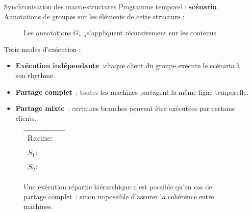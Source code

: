 \begin{block}{Synchronisation des macro-structures}
	Programme temporel : \textbf{scénario}. 
	Annotations de groupes sur les éléments de cette structure : 
    
    \begin{figure}
        \begin{tikzpicture}[scale=4]
        
        \end{tikzpicture}
        \caption{Les annotations $G_{1..5}$s'appliquent récursivement sur les contenus}
    \end{figure}
	Trois modes d'exécution : 
	\begin{itemize}
		\item \textbf{Exécution indépendante}~:chaque client du groupe exécute le scénario à son rhythme.
		\item \textbf{Partage complet}~: toutes les machines partagent la même ligne temporelle.
		\item \textbf{Partage mixte}~: certaines branches peuvent être exécutées par certains clients.
	\end{itemize}

    
    \begin{figure} \hspace*{-11cm}
        \begin{tabular}{L{3.5em}R{0.3\textwidth}}
            Racine: & \begin{tikzpicture}[scale=3.5]
            
            \end{tikzpicture} \\
            $S_1$: & \begin{tikzpicture}[scale=1.5, every node/.style={scale=0.8}]
            
            \end{tikzpicture} \\
            $S_2$: & \begin{tikzpicture}[scale=2.5, every node/.style={scale=0.8}]
            
            \end{tikzpicture} \\
        \end{tabular}
        \caption{
            Une exécution répartie hiérarchique n'est possible qu'en cas de partage complet~: sinon impossible d'assurer la cohérence entre machines.}
    \end{figure}
    
\end{block}